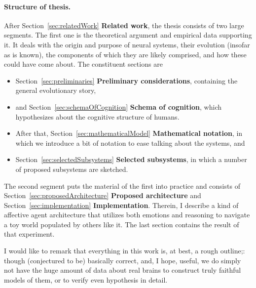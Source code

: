 \paragraph{Structure of thesis.} After Section~\ref{sec:relatedWork} \textbf{Related work}, the thesis consists of two large segments. The first one is the theoretical argument and empirical data supporting it. It deals with the origin and purpose of neural systems, their evolution (insofar as is known), the components of which they are likely comprised, and how these could have come about. The constituent sections are
	\begin{itemize}
		\item Section~\ref{sec:preliminaries} \textbf{Preliminary considerations}, containing the general evolutionary story,
		\item and Section~\ref{sec:schemaOfCognition} \textbf{Schema of cognition}, which hypothesizes about the cognitive structure of humans.
		\item After that, Section~\ref{sec:mathematicalModel} \textbf{Mathematical notation}, in which we introduce a bit of notation to ease talking about the systems, and
		\item Section~\ref{sec:selectedSubsystems} \textbf{Selected subsystems}, in which a number of proposed subsystems are sketched.
	\end{itemize}
	
The second segment puts the material of the first into practice and consists of Section~\ref{sec:proposedArchitecture} \textbf{Proposed architecture} and Section~\ref{sec:implementation} \textbf{Implementation}. Therein, I describe a kind of affective agent architecture that utilizes both emotions and reasoning to navigate a toy world populated by others like it. The last section contains the result of that experiment.

I would like to remark that everything in this work is, at best, a rough outline;: though (conjectured to be) basically correct, and, I hope, useful, we do simply not have the huge amount of data about real brains to construct truly faithful models of them, or to verify even hypothesis in detail.